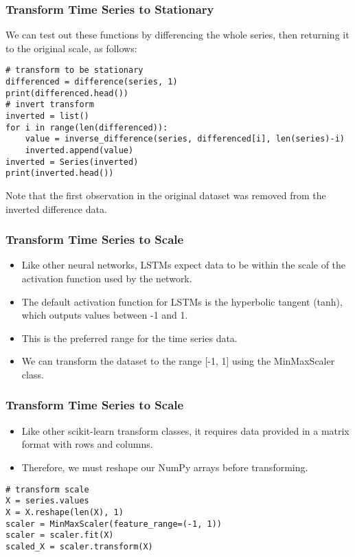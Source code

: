 \begin{frame}[fragile] \frametitle{Transform Time Series to Stationary}
We can test out these functions by differencing the whole series, then returning it to the original scale, as follows:
\begin{lstlisting}
# transform to be stationary
differenced = difference(series, 1)
print(differenced.head())
# invert transform
inverted = list()
for i in range(len(differenced)):
	value = inverse_difference(series, differenced[i], len(series)-i)
	inverted.append(value)
inverted = Series(inverted)
print(inverted.head())
\end{lstlisting}   
Note that the first observation in the original dataset was removed from the inverted difference data. 
\end{frame}

\begin{frame}[fragile] \frametitle{Transform Time Series to Scale}
\begin{itemize}
\item Like other neural networks, LSTMs expect data to be within the scale of the activation function used by the network.
\item The default activation function for LSTMs is the hyperbolic tangent (tanh), which outputs values between -1 and 1. 
\item This is the preferred range for the time series data.
\item We can transform the dataset to the range [-1, 1] using the MinMaxScaler class. 
\end{itemize}
\end{frame}

\begin{frame}[fragile] \frametitle{Transform Time Series to Scale}
\begin{itemize}
\item Like other scikit-learn transform classes, it requires data provided in a matrix format with rows and columns. 
\item Therefore, we must reshape our NumPy arrays before transforming.
\end{itemize}
\begin{lstlisting}
# transform scale
X = series.values
X = X.reshape(len(X), 1)
scaler = MinMaxScaler(feature_range=(-1, 1))
scaler = scaler.fit(X)
scaled_X = scaler.transform(X)
\end{lstlisting}   
\end{frame}

